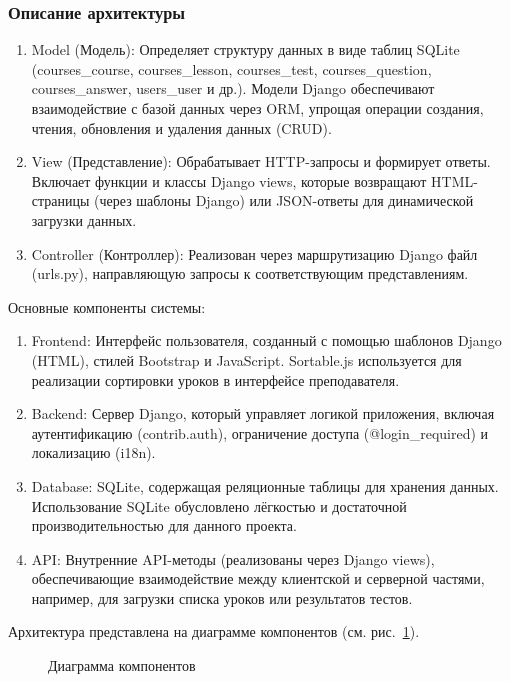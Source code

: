 \subsubsection{Описание архитектуры}

\begin{enumerate}
	\item {Model} (Модель): Определяет структуру данных в виде таблиц SQLite (courses\_course, courses\_lesson, courses\_test, courses\_question, courses\_answer, users\_user и др.). Модели Django обеспечивают взаимодействие с базой данных через ORM, упрощая операции создания, чтения, обновления и удаления данных (CRUD).
	\item {View} (Представление): Обрабатывает HTTP-запросы и формирует ответы. Включает функции и классы Django views, которые возвращают HTML-страницы (через шаблоны Django) или JSON-ответы для динамической загрузки данных.
	\item {Controller} (Контроллер): Реализован через маршрутизацию Django файл (urls.py), направляющую запросы к соответствующим представлениям.
\end{enumerate}

Основные компоненты системы:
\begin{enumerate}
	\item {Frontend}: Интерфейс пользователя, созданный с помощью шаблонов Django (HTML), стилей Bootstrap и JavaScript. Sortable.js используется для реализации сортировки уроков в интерфейсе преподавателя.
	\item {Backend}: Сервер Django, который управляет логикой приложения, включая аутентификацию (contrib.auth), ограничение доступа (@login\_required) и локализацию (i18n).
	\item {Database}: SQLite, содержащая реляционные таблицы для хранения данных. Использование SQLite обусловлено лёгкостью и достаточной производительностью для данного проекта.
	\item {API}: Внутренние API-методы (реализованы через Django views), обеспечивающие взаимодействие между клиентской и серверной частями, например, для загрузки списка уроков или результатов тестов.
\end{enumerate}

Архитектура представлена на диаграмме компонентов (см. рис.~\ref{diag:image}).

\begin{figure}[htp!]
	\caption{Диаграмма компонентов}
	\label{diag:image}
\end{figure}

